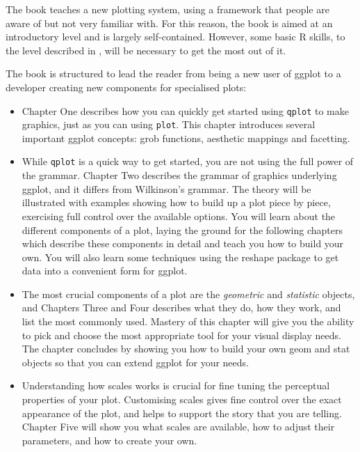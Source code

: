 \documentclass[oneside,letterpaper]{scrartcl}
\begin{document}
The book teaches a new plotting system, using a framework that people are aware of but not very familiar with.  For this reason, the book is aimed at an introductory level and is largely self-contained.  However, some basic R skills, to the level described in \citet{dalgaard:2002}, will be necessary to get the most out of it.

The book is structured to lead the reader from being a new user of ggplot to a developer creating new components for specialised plots:

\begin{itemize}
	\item Chapter One describes how you can quickly get started using {\tt qplot} to make graphics, just as you can using {\tt plot}.  This chapter introduces several important ggplot concepts: grob functions, aesthetic mappings and facetting.
	
	\item While {\tt qplot} is a quick way to get started, you are not using the full power of the grammar.  Chapter Two describes the grammar of graphics underlying ggplot, and it differs from Wilkinson's grammar.  The theory will be illustrated with examples showing how to build up a plot piece by piece, exercising full control over the available options.  You will learn about the different components of a plot, laying the ground for the following chapters which describe these components in detail and teach you how to build your own.  You will also learn some techniques using the reshape package to get data into a convenient form for ggplot.

	\item The most crucial components of a plot are the {\em geometric} and {\em statistic} objects, and Chapters Three and Four describes what they do, how they work, and list the most commonly used.  Mastery of this chapter will give you the ability to pick and choose the most appropriate tool for your visual display needs.  The chapter concludes by showing you how to build your own geom and stat objects so that you can extend ggplot for your needs.

	\item Understanding how scales works is crucial for fine tuning the perceptual properties of your plot.  Customising scales gives fine control over the exact appearance of the plot, and helps to support the story that you are telling.  Chapter Five will show you what scales are available, how to adjust their parameters, and how to create your own.


\end{itemize}
\end{document}
